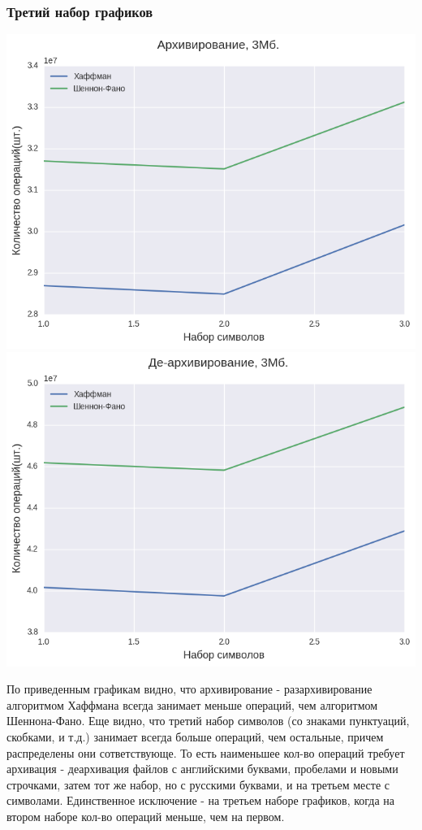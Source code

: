 \documentclass[russian, a4paper, 12pt]{article}
\begin{document}
\subsubsection{Третий набор графиков}
\begin{center}
\includegraphics[width=0.9\linewidth]{./plots/3/3_1.png}\\
\includegraphics[width=0.9\linewidth]{./plots/3/3_2.png}\\
\end{center}

\newpage
По приведенным графикам видно, что архивирование - разархивирование
алгоритмом Хаффмана всегда занимает меньше операций, чем алгоритмом Шеннона-Фано.
Еще видно, что третий набор символов (со знаками пунктуаций, скобками, и т.д.) занимает
всегда больше операций, чем остальные, причем распределены они сответствующе. То есть
наименьшее кол-во операций требует архивация - деархивация файлов с английскими буквами,
пробелами и новыми строчками, затем тот же набор, но с русскими буквами, и на третьем месте
с символами. Единственное исключение - на третьем наборе графиков, когда на втором наборе кол-во
операций меньше, чем на первом.
\newpage
\end{document}
